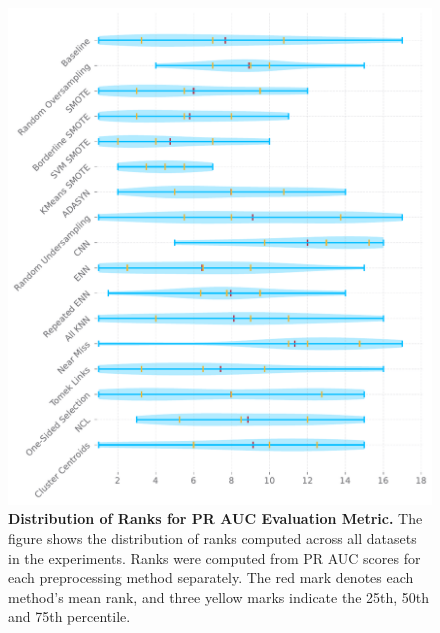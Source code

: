 \begin{figure}
    \centering
    \includegraphics[width=\linewidth]{figures/pr_auc_ranks_distribution.pdf}
    \caption{
        \textbf{Distribution of Ranks for PR AUC Evaluation Metric.} The figure shows the
        distribution of ranks computed across all datasets in the experiments. Ranks were computed
        from PR AUC scores for each preprocessing method separately. The red mark denotes each
        method’s mean rank, and three yellow marks indicate the 25th, 50th and 75th percentile.
    }
    \label{figure:pr_auc_rank_distributions}
\end{figure}

